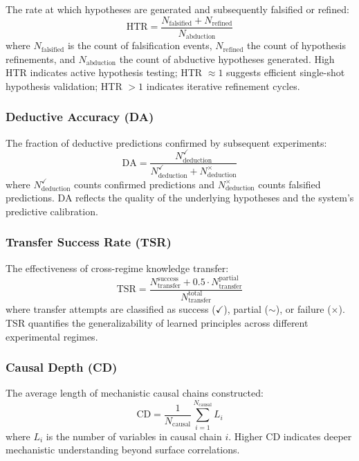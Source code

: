 \documentclass[10pt,twocolumn]{article}
\begin{document}
The rate at which hypotheses are generated and subsequently falsified or refined:
\begin{equation}
    \text{HTR} = \frac{N_{\text{falsified}} + N_{\text{refined}}}{N_{\text{abduction}}}
\end{equation}
where $N_{\text{falsified}}$ is the count of falsification events, $N_{\text{refined}}$ the count of hypothesis refinements, and $N_{\text{abduction}}$ the count of abductive hypotheses generated. High HTR indicates active hypothesis testing; HTR $\approx 1$ suggests efficient single-shot hypothesis validation; HTR $> 1$ indicates iterative refinement cycles.

\subsubsection{Deductive Accuracy (DA)}

The fraction of deductive predictions confirmed by subsequent experiments:
\begin{equation}
    \text{DA} = \frac{N_{\text{deduction}}^{\checkmark}}{N_{\text{deduction}}^{\checkmark} + N_{\text{deduction}}^{\times}}
\end{equation}
where $N_{\text{deduction}}^{\checkmark}$ counts confirmed predictions and $N_{\text{deduction}}^{\times}$ counts falsified predictions. DA reflects the quality of the underlying hypotheses and the system's predictive calibration.

\subsubsection{Transfer Success Rate (TSR)}

The effectiveness of cross-regime knowledge transfer:
\begin{equation}
    \text{TSR} = \frac{N_{\text{transfer}}^{\text{success}} + 0.5 \cdot N_{\text{transfer}}^{\text{partial}}}{N_{\text{transfer}}^{\text{total}}}
\end{equation}
where transfer attempts are classified as success ($\checkmark$), partial ($\sim$), or failure ($\times$). TSR quantifies the generalizability of learned principles across different experimental regimes.

\subsubsection{Causal Depth (CD)}

The average length of mechanistic causal chains constructed:
\begin{equation}
    \text{CD} = \frac{1}{N_{\text{causal}}} \sum_{i=1}^{N_{\text{causal}}} L_i
\end{equation}
where $L_i$ is the number of variables in causal chain $i$. Higher CD indicates deeper mechanistic understanding beyond surface correlations.
\end{document}
